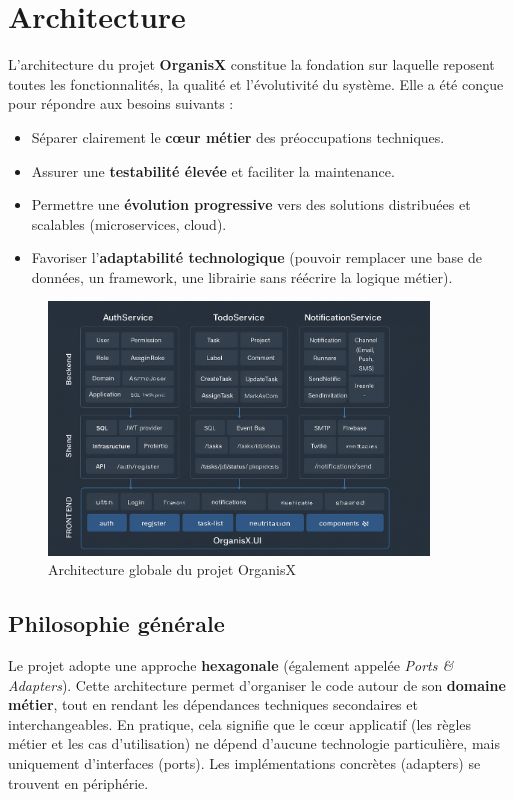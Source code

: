 \chapter{Architecture}

L’architecture du projet \textbf{OrganisX} constitue la fondation sur laquelle reposent toutes les fonctionnalités, la qualité et l’évolutivité du système. Elle a été conçue pour répondre aux besoins suivants :
\begin{itemize}
	\item Séparer clairement le \textbf{cœur métier} des préoccupations techniques.
	\item Assurer une \textbf{testabilité élevée} et faciliter la maintenance.
	\item Permettre une \textbf{évolution progressive} vers des solutions distribuées et scalables (microservices, cloud).
	\item Favoriser l’\textbf{adaptabilité technologique} (pouvoir remplacer une base de données, un framework, une librairie sans réécrire la logique métier).
\end{itemize}

\begin{figure}[h!]
	\centering
	\includegraphics[width=0.9\textwidth]{images/architecture.png}
	\caption{Architecture globale du projet OrganisX}
	\label{fig:architecture}
\end{figure}

\section{Philosophie générale}
Le projet adopte une approche \textbf{hexagonale} (également appelée \textit{Ports \& Adapters}).  
Cette architecture permet d’organiser le code autour de son \textbf{domaine métier}, tout en rendant les dépendances techniques secondaires et interchangeables.  
En pratique, cela signifie que le cœur applicatif (les règles métier et les cas d’utilisation) ne dépend d’aucune technologie particulière, mais uniquement d’interfaces (ports). Les implémentations concrètes (adapters) se trouvent en périphérie.

